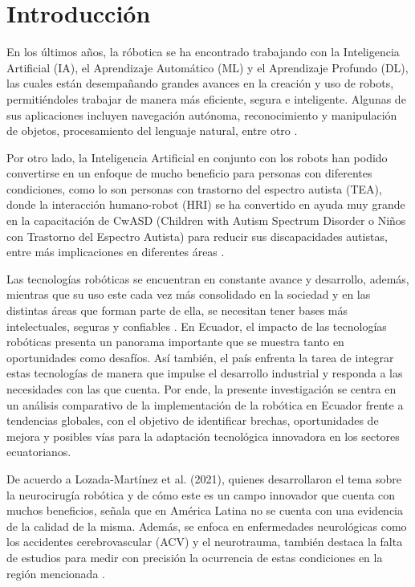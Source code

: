 \documentclass[conference]{IEEEtran}
\begin{document}
\section{Introducción}

En los últimos años, la róbotica se ha encontrado trabajando con la Inteligencia Artificial (IA), el Aprendizaje Automático (ML) y el Aprendizaje Profundo (DL), las cuales están desempañando grandes avances en la creación y uso de robots, permitiéndoles trabajar de manera más eficiente, segura e inteligente. Algunas de sus aplicaciones incluyen navegación autónoma, reconocimiento y manipulación de objetos, procesamiento del lenguaje natural, entre otro \cite{Soori2023}.

Por otro lado, la Inteligencia Artificial en conjunto con los robots han podido convertirse en un enfoque de mucho beneficio para personas con diferentes condiciones, como lo son personas con trastorno del espectro autista (TEA), donde la interacción humano-robot (HRI) se ha convertido en ayuda muy grande en la capacitación de CwASD (Children with Autism Spectrum Disorder o Niños con Trastorno del Espectro Autista) para reducir sus discapacidades autistas, entre más implicaciones en diferentes áreas \cite{Islam2023}. 

Las tecnologías robóticas se encuentran en constante avance y desarrollo, además, mientras que su uso este cada vez más consolidado en la sociedad y en las distintas áreas que forman parte de ella, se necesitan tener bases más intelectuales, seguras y confiables \cite{Koditschek2021}. En Ecuador, el impacto de las tecnologías robóticas presenta un panorama importante que se muestra tanto en oportunidades como desafíos. Así también, el país enfrenta la tarea de integrar estas tecnologías de manera que impulse el desarrollo industrial y responda a las necesidades con las que cuenta. Por ende, la presente investigación se centra en un análisis comparativo de la implementación de la robótica en Ecuador frente a tendencias globales, con el objetivo de identificar brechas, oportunidades de mejora y posibles vías para la adaptación tecnológica innovadora en los sectores ecuatorianos.

De acuerdo a Lozada-Martínez et al. (2021), quienes desarrollaron el tema sobre la neurocirugía robótica y de cómo este es un campo innovador que cuenta con muchos beneficios, señala que en América Latina no se cuenta con una evidencia de la calidad de la misma. Además, se enfoca en enfermedades neurológicas como los accidentes cerebrovascular (ACV) y el neurotrauma, también destaca la falta de estudios para medir con precisión la ocurrencia de estas condiciones en la región mencionada \cite{Neurosurgery}. 
\end{document}
